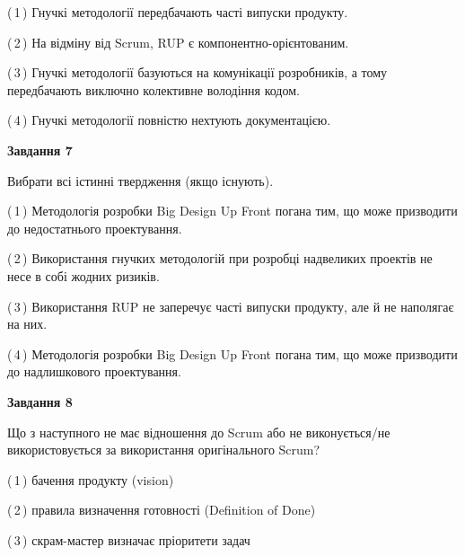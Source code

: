 \documentclass[10pt, ukrainian]{article}
\begin{document}
{\begin {large}
(\,1\,) Гнучкі методології передбачають часті випуски продукту. %



(\,2\,) На відміну від Scrum, RUP є компонентно-орієнтованим. %



(\,3\,) Гнучкі методології базуються на комунікації розробників, а тому передбачають виключно колективне володіння кодом. %



(\,4\,) Гнучкі методології повністю нехтують документацією. %


{\begin {center}\textbf{Завдання 7}\end {center}}\par
Вибрати всі істинні твердження (якщо існують).\par
\vspace{2mm}



(\,1\,) Методологія розробки Big Design Up Front погана тим, що може призводити до недостатнього проектування.%



(\,2\,) Використання гнучких методологій при розробці надвеликих проектів не несе в собі жодних ризиків. %



(\,3\,) Використання RUP не заперечує часті випуски продукту, але й не наполягає на них. %



(\,4\,) Методологія розробки Big Design Up Front погана тим, що може призводити до надлишкового проектування. %


{\begin {center}\textbf{Завдання 8}\end {center}}\par
Що з наступного не має відношення до Scrum або не виконується/не використовується за використання оригінального Scrum?\par
\vspace{2mm}



(\,1\,) бачення продукту (vision) %



(\,2\,) правила визначення готовності (Definition of Done) %



(\,3\,) скрам-мастер визначає пріоритети задач%




\end{large}}
\end{document}
